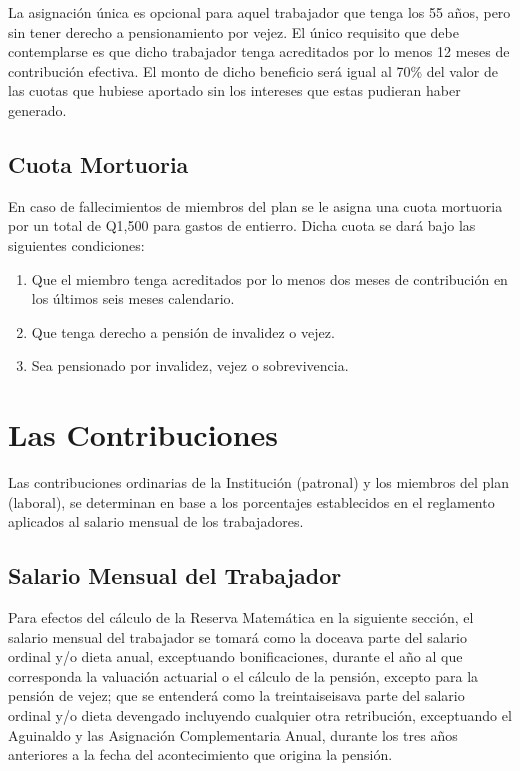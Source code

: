 \documentclass[12pt,letterpaper,titlepage]{article}
\begin{document}
{La asignación única es opcional para aquel trabajador que tenga los 55 años, pero sin tener derecho a pensionamiento por vejez. El único requisito que debe contemplarse es que dicho trabajador tenga acreditados por lo menos 12 meses de contribución efectiva. El monto de dicho beneficio será igual al 70\% del valor de las cuotas que hubiese aportado sin los intereses que estas pudieran haber generado.

\subsection{Cuota Mortuoria}

En caso de fallecimientos de miembros del plan se le asigna una cuota mortuoria por un total de Q1,500 para gastos de entierro. Dicha cuota se dará bajo las siguientes condiciones:

\begin{enumerate}
	\item Que el miembro tenga acreditados por lo menos dos meses de contribución en los últimos seis meses calendario.
	\item Que tenga derecho a pensión de invalidez o vejez.
	\item Sea pensionado por invalidez, vejez o sobrevivencia.
\end{enumerate}


\newpage
\section{Las Contribuciones}

Las contribuciones ordinarias de la Institución (patronal) y los miembros del plan (laboral), se determinan en base a los porcentajes establecidos en el reglamento aplicados al salario mensual de los trabajadores.

\subsection{Salario Mensual del Trabajador}

Para efectos del cálculo de la Reserva Matemática en la siguiente sección, el salario mensual del trabajador se tomará como la doceava parte del salario ordinal y/o dieta anual, exceptuando bonificaciones, durante el año al que corresponda la valuación actuarial o el cálculo de la pensión, excepto para la pensión de vejez; que se entenderá como la treintaiseisava parte del salario ordinal y/o dieta devengado incluyendo cualquier otra retribución, exceptuando el Aguinaldo y las Asignación Complementaria Anual, durante los tres años anteriores a la fecha del acontecimiento que origina la pensión.

}
\end{document}
